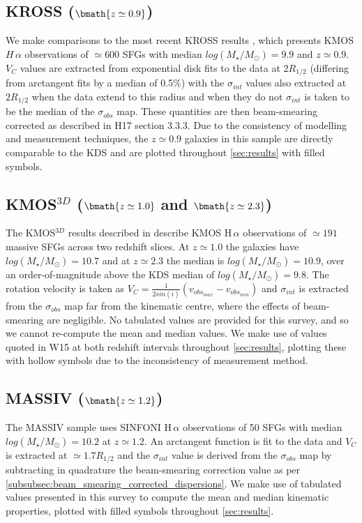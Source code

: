 \documentclass[fleqn,usenatbib]{mnras}
\begin{document}
\subsection{KROSS ($\bmath{z\simeq0.9}$)}\label{subsec:KROSS}
We make comparisons to the most recent KROSS results \citep[H17]{Harrison2017}, which presents KMOS $H\,\alpha$ observations of $\simeq600$ SFGs with median $log(M_{\star}/M_{\odot})=9.9$ and $z\simeq0.9$.
$V_{C}$ values are extracted from exponential disk fits to the data at $2R_{1/2}$ (differing from arctangent fits by a median of 0.5\%) with the $\sigma_{int}$ values also extracted at $2R_{1/2}$ when the data extend to this radius and when they do not $\sigma_{int}$ is taken to be the median of the $\sigma_{obs}$ map.
These quantities are then beam-smearing corrected as described in H17 section 3.3.3. 
Due to the consistency of modelling and measurement techniques, the $z\simeq0.9$ galaxies in this sample are directly comparable to the KDS and are plotted throughout \cref{sec:results} with filled symbols.

\subsection{KMOS$^{3D}$ ($\bmath{z\simeq1.0}$ and $\bmath{z\simeq2.3}$)}\label{subsec:kmos_3d}
The KMOS$^{3D}$ results described in \cite[W15]{Wisnioski2015} describe KMOS H$\,\alpha$ observations of $\simeq191$ massive SFGs across two redshift slices. 
At $z\simeq1.0$ the galaxies have $log(M_{\star}/M_{\odot})=10.7$ and at $z\simeq2.3$ the median is $log(M_{\star}/M_{\odot})=10.9$, over an order-of-magnitude above the KDS median of $log(M_{\star}/M_{\odot})=9.8$. The rotation velocity is taken as $V_{C} = \frac{1}{2sin(i)}(v_{obs_{max}} - v_{obs_{min}})$ and $\sigma_{int}$ is extracted from the $\sigma_{obs}$ map far from the kinematic centre, where the effects of beam-smearing are negligible.
No tabulated values are provided for this survey, and so we cannot re-compute the mean and median values.
We make use of values quoted in W15 at both redshift intervals throughout \cref{sec:results}, plotting these with hollow symbols due to the inconsistency of measurement method.

\subsection{MASSIV ($\bmath{z\simeq1.2}$)}\label{subsec:MASSIV}
The MASSIV sample \citep[E12]{Epinat2012} uses SINFONI H$\,\alpha$ observations of 50 SFGs with median $log(M_{\star}/M_{\odot})=10.2$ at $z\simeq1.2$.
An arctangent function is fit to the data and $V_{C}$ is extracted at $\simeq1.7R_{1/2}$ and the $\sigma_{int}$ value is derived from the $\sigma_{obs}$ map by subtracting in quadrature the beam-smearing correction value as per \cref{subsubsec:beam_smearing_corrected_dispersions}.
We make use of tabulated values presented in this survey to compute the mean and median kinematic properties, plotted with filled symbols throughout \cref{sec:results}.
\end{document}
